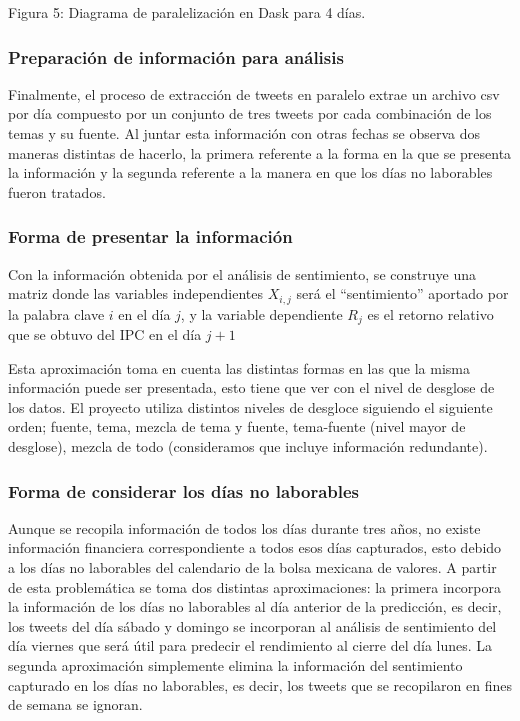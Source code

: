 \documentclass[12pt,reqno,letter]{article}
\newenvironment{fig2}[1][\unskip]{}{} %
\begin{document}
\begin{multicols}{2}
\begin{fig2}
    \caption{Figura 5: Diagrama de paralelización en Dask para 4 días.}
    \end{fig2}
    
    
\subsubsection{Preparación de información para análisis}

    Finalmente, el proceso de extracción de tweets en paralelo extrae un archivo csv por día compuesto por un conjunto de tres tweets por cada combinación de los temas y su fuente. Al juntar esta información con otras fechas se observa dos maneras distintas de hacerlo, la primera referente a la forma en la que se presenta la información y la segunda referente a la manera en que los días no laborables fueron tratados. 
    
\subsubsection{Forma de presentar la información}

	Con la información obtenida por el análisis de sentimiento, se construye una matriz donde las  variables independientes $X_{i,j}$ será el ``sentimiento'' aportado por la palabra clave $i$ en el día $j$, y la variable dependiente $R_j$ es el retorno relativo que se obtuvo del IPC en el día $j+1$

    Esta aproximación toma en cuenta las distintas formas en las que la misma información puede ser presentada, esto tiene que ver con el nivel de desglose de los datos. El proyecto utiliza distintos niveles de desgloce siguiendo el siguiente orden; fuente, tema, mezcla de tema y fuente, tema-fuente (nivel mayor de desglose), mezcla de todo (consideramos que incluye información redundante).

\subsubsection{Forma de considerar los días no laborables}

    Aunque se recopila información de todos los días durante tres años, no existe información financiera correspondiente a todos esos días capturados, esto debido a los días no laborables del calendario de la bolsa mexicana de valores. A partir de esta problemática se toma dos distintas aproximaciones: la primera incorpora la información de los días no laborables al día anterior de la predicción, es decir, los tweets del día sábado y domingo se incorporan al análisis de sentimiento del día viernes que será útil para predecir el rendimiento al cierre del día lunes. La segunda aproximación simplemente elimina la información del sentimiento capturado en los días no laborables, es decir, los tweets que se recopilaron en fines de semana se ignoran.


\end{multicols}
\end{document}
